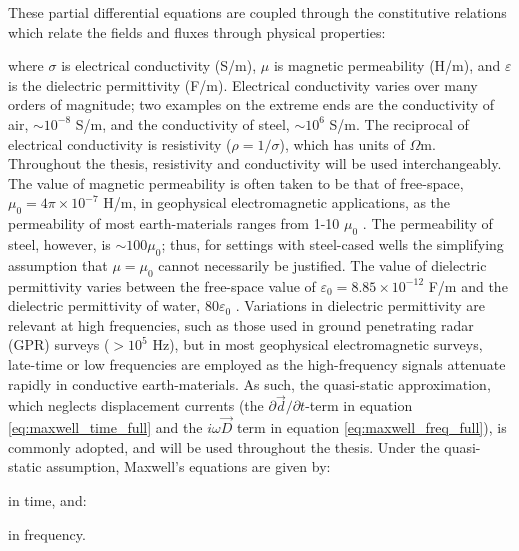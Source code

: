These partial differential equations are coupled through the constitutive relations which relate the fields and fluxes through physical properties:

where $\sigma$ is electrical conductivity (S/m), $\mu$ is magnetic permeability (H/m), and $\varepsilon$ is the dielectric permittivity (F/m). Electrical conductivity varies over many orders of magnitude; two examples on the extreme ends are the conductivity of air, $\sim10^{-8}$ S/m, and the conductivity of steel, $\sim 10^6$ S/m. The reciprocal of electrical conductivity is resistivity ($\rho = 1/\sigma$), which has units of $\Omega$m. Throughout the thesis, resistivity and conductivity will be used interchangeably. The value of magnetic permeability is often taken to be that of free-space, $\mu_0 = 4\pi\times10^{-7}$ H/m, in geophysical electromagnetic applications, as the permeability of most earth-materials ranges from 1-10 $\mu_0$ \citep{Telford1990}. The permeability of steel, however, is $\sim 100 \mu_0$; thus, for settings with steel-cased wells the simplifying assumption that $\mu=\mu_0$ cannot necessarily be justified. The value of dielectric permittivity varies between the free-space value of $\varepsilon_0=8.85\times10^{-12}$ F/m and the dielectric permittivity of water, $80\varepsilon_0$ \citep{Telford1990}. Variations in dielectric permittivity are relevant at high frequencies, such as those used in ground penetrating radar (GPR) surveys ($> 10^5$ Hz), but in most geophysical electromagnetic surveys, late-time or low frequencies are employed as the high-frequency signals attenuate rapidly in conductive earth-materials. As such, the quasi-static approximation, which neglects displacement currents (the $\partial \vec{d} / \partial t$-term in equation \ref{eq:maxwell_time_full} and the $i\omega\vec{D}$ term in equation \ref{eq:maxwell_freq_full}), is commonly adopted, and will be used throughout the thesis. Under the quasi-static assumption, Maxwell's equations are given by:

in time, and:

 in frequency.


